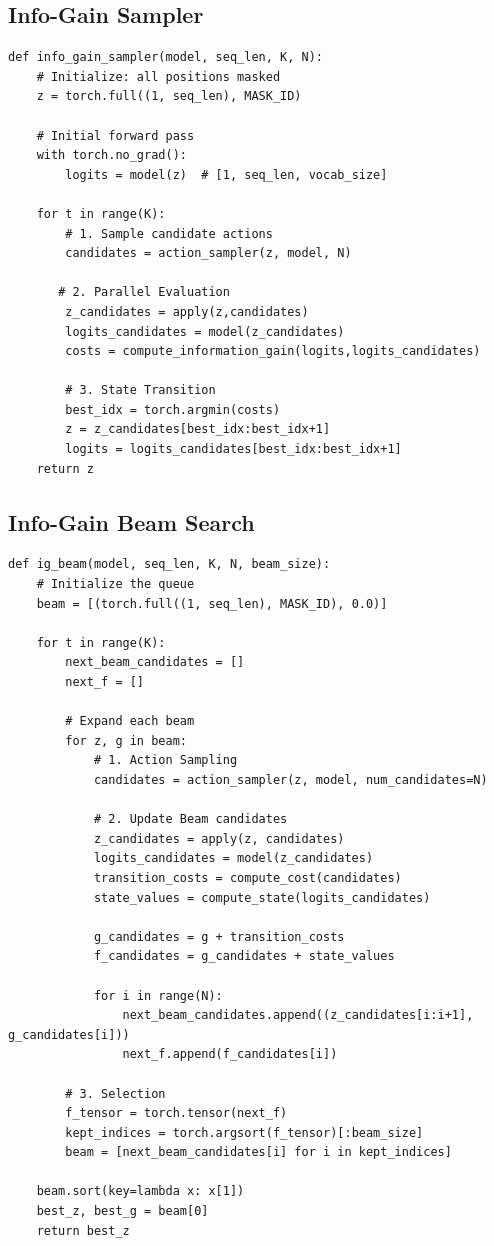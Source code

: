 \subsection{Info-Gain Sampler}
\begin{lstlisting}[style=pytorch, caption={Info-Gain Sampler}]
def info_gain_sampler(model, seq_len, K, N):
    # Initialize: all positions masked
    z = torch.full((1, seq_len), MASK_ID)
    
    # Initial forward pass
    with torch.no_grad():
        logits = model(z)  # [1, seq_len, vocab_size]
    
    for t in range(K):
        # 1. Sample candidate actions
        candidates = action_sampler(z, model, N) 
        
       # 2. Parallel Evaluation
        z_candidates = apply(z,candidates)
        logits_candidates = model(z_candidates)
        costs = compute_information_gain(logits,logits_candidates)
        
        # 3. State Transition
        best_idx = torch.argmin(costs)
        z = z_candidates[best_idx:best_idx+1]
        logits = logits_candidates[best_idx:best_idx+1]
    return z
\end{lstlisting}
\subsection{Info-Gain Beam Search}
\begin{lstlisting}[style=pytorch, caption={Info-Gain Beam Search}, label={alg:igp_beam}]
def ig_beam(model, seq_len, K, N, beam_size):
    # Initialize the queue
    beam = [(torch.full((1, seq_len), MASK_ID), 0.0)]
    
    for t in range(K):
        next_beam_candidates = []
        next_f = []
        
        # Expand each beam
        for z, g in beam:
            # 1. Action Sampling
            candidates = action_sampler(z, model, num_candidates=N)
            
            # 2. Update Beam candidates
            z_candidates = apply(z, candidates)
            logits_candidates = model(z_candidates)
            transition_costs = compute_cost(candidates)
            state_values = compute_state(logits_candidates)
            
            g_candidates = g + transition_costs
            f_candidates = g_candidates + state_values
            
            for i in range(N):
                next_beam_candidates.append((z_candidates[i:i+1], g_candidates[i]))
                next_f.append(f_candidates[i])
        
        # 3. Selection
        f_tensor = torch.tensor(next_f)
        kept_indices = torch.argsort(f_tensor)[:beam_size] 
        beam = [next_beam_candidates[i] for i in kept_indices]
    
    beam.sort(key=lambda x: x[1])
    best_z, best_g = beam[0]
    return best_z
\end{lstlisting}

